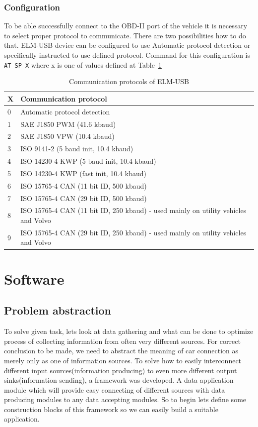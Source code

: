 \subsubsection{Configuration} %
\label{ssub:configuration}
To be able successfully connect to the OBD-II port of the vehicle it is necessary to select proper protocol to communicate. There are two possibilities how to do that. ELM-USB device can be configured to use Automatic protocol detection or specifically instructed to use defined protocol. Command for this configuration is \verb|AT SP X|\cite{at_cmd} where x is one of values defined at Table~\ref{tab:tab3}
\begin{table}[H]
 \begin{center}
   \begin{tabular}{l l}
   X & Communication protocol\\
   \hline
	0 & Automatic protocol detection \\
	1 & SAE J1850 PWM (41.6 kbaud) \\
	2 & SAE J1850 VPW (10.4 kbaud) \\
	3 & ISO 9141-2 (5 baud init, 10.4 kbaud) \\
	4 & ISO 14230-4 KWP (5 baud init, 10.4 kbaud) \\
	5 & ISO 14230-4 KWP (fast init, 10.4 kbaud) \\
	6 & ISO 15765-4 CAN (11 bit ID, 500 kbaud) \\
	7 & ISO 15765-4 CAN (29 bit ID, 500 kbaud) \\
	8 & ISO 15765-4 CAN (11 bit ID, 250 kbaud) - used mainly on utility vehicles and Volvo \\
	9 & ISO 15765-4 CAN (29 bit ID, 250 kbaud) - used mainly on utility vehicles and Volvo \\
   \hline
   \end{tabular}
 \end{center}
 \caption{Communication protocols of ELM-USB}
 \label{tab:tab3}
\end{table}
\section{Software} %
\label{sec:software}
\subsection{Problem abstraction} %
\label{sub:problem_abstraction}
To solve given task, lets look at data gathering and what can be done to optimize process of collecting information from often very different sources. For correct conclusion to be made, we need to abstract the meaning of car connection as merely only as one of information sources. To solve how to easily interconnect different input sources(information producing) to even more different output sinks(information sending), a framework was developed. A data application module which will provide easy connecting of different sources with data producing modules to any data accepting modules. So to begin lets define some construction blocks of this framework so we can easily build a suitable application.
